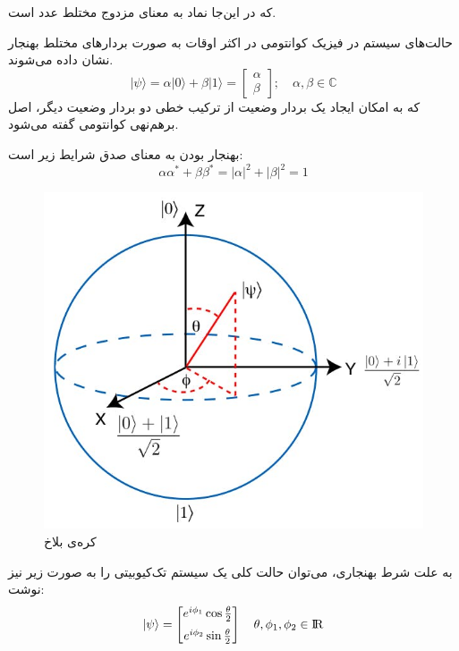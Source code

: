 که در این‌جا نماد \lr{$\alpha^*$}
به معنای مزدوج مختلط عدد \lr{$\alpha$}
است.
\newpage

حالت‌های سیستم در فیزیک کوانتومی در اکثر اوقات به صورت بردارهای مختلط بهنجار نشان داده می‌شوند.
\begin{equation}
    |\psi\rangle = \alpha |0\rangle + \beta |1\rangle = \begin{bmatrix} \alpha \\ \beta \end{bmatrix} 
    ; \mspace{18mu}
    \alpha, \beta \in \mathbb{C}
\end{equation}
{}
که به امکان ایجاد یک بردار وضعیت از ترکیب خطی دو بردار وضعیت دیگر، اصل برهم‌نهی کوانتومی گفته می‌شود.

بهنجار بودن به معنای صدق شرایط زیر است:
\begin{equation}
    \alpha\alpha^* + \beta\beta^* = |\alpha|^2 + |\beta|^2 = 1
\end{equation}
\begin{figure}
	\centering
	\includegraphics[scale=0.4]{figures/bloch.jpg}
	\caption{کره‌ی بلاخ}
	\label{fig:bloch}
\end{figure}
به علت شرط بهنجاری، می‌توان حالت کلی یک سیستم تک‌کیوبیتی را به صورت زیر نیز نوشت:
\begin{equation}
|\psi\rangle = \begin{bmatrix} e^{i\phi_1}\cos{\tfrac{\theta}{2}} \\[6pt] e^{i\phi_2}\sin{\tfrac{\theta}{2}} \end{bmatrix} 
\mspace{18mu}
\theta, \phi_1, \phi_2 \in {\rm I\!R}
\end{equation}

